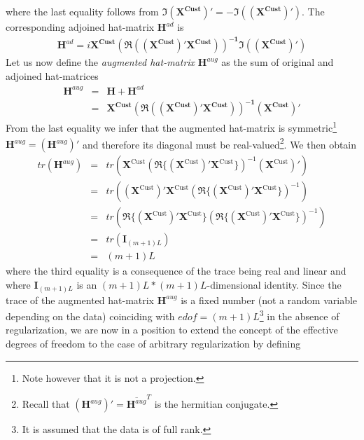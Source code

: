 \documentclass[a4paper]{book}
\begin{document}
where the last equality follows from $\mathbf{\Im\left(X^{\textrm{Cust}}\right)'}=-\mathbf{\Im\left((X^{\textrm{Cust}})'\right)}$. 
The corresponding adjoined hat-matrix $\mathbf{H}^{ad}$ is
\begin{eqnarray*}
\mathbf{H}^{ad}=i\mathbf{X^{\textrm{Cust}}}\mathbf{\left(\Re((X^{\textrm{Cust}})'X^{\textrm{Cust}})\right)^{-1}}\mathbf{\Im\left((X^{\textrm{Cust}})'\right)}
\end{eqnarray*}
Let us now define the \emph{augmented hat-matrix} $\mathbf{H}^{aug}$ as the sum of original and adjoined hat-matrices
\begin{eqnarray*}
\mathbf{H}^{aug}&=&\mathbf{H}+\mathbf{H}^{ad}\\
&=&\mathbf{X^{\textrm{Cust}}}\mathbf{\left(\Re((X^{\textrm{Cust}})'X^{\textrm{Cust}})\right)^{-1}}\mathbf{\left(X^{\textrm{Cust}}\right)'}
\end{eqnarray*}
From the last equality we infer that the augmented hat-matrix is symmetric\footnote{Note however that it is not a projection.} $\mathbf{H}^{aug}=(\mathbf{H}^{aug})'$ and therefore its diagonal must be real-valued\footnote{Recall that $(\mathbf{H}^{aug})'=\overline{\mathbf{H}^{aug}}^T$ is the hermitian conjugate.}. We then obtain 
\begin{eqnarray*}
tr(\mathbf{H}^{aug})&=&tr\left(\mathbf{X}^{\textrm{Cust}}\left(\Re\big\{(\mathbf{X}^{\textrm{Cust}})' \mathbf{X}^{\textrm{Cust}}\big\}
\right)^{-1}(\mathbf{X}^{\textrm{Cust}})'\right)\\
&=&tr\left((\mathbf{X}^{\textrm{Cust}})'\mathbf{X}^{\textrm{Cust}}\left(\Re\big\{(\mathbf{X}^{\textrm{Cust}})' \mathbf{X}^{\textrm{Cust}}\big\}\right)^{-1}\right)\\
&=&tr\left(\Re\Big\{(\mathbf{X}^{\textrm{Cust}})'\mathbf{X}^{\textrm{Cust}}\Big\}\left(\Re\big\{(\mathbf{X}^{\textrm{Cust}})' \mathbf{X}^{\textrm{Cust}}\big\}\right)^{-1}\right)\\
&=&tr(\mathbf{I}_{(m+1)L})\\
&=&(m+1)L
\end{eqnarray*}
where the third equality is a consequence of the trace being real and linear and where $\mathbf{I}_{(m+1)L}$ is an $(m+1)L*(m+1)L$-dimensional identity. Since the trace of the augmented hat-matrix $\mathbf{H}^{aug}$ is a fixed number (not a random variable depending on the data) coinciding with $edof=(m+1)L$\footnote{It is assumed that the data is of full rank.} in the absence of regularization, we are now in a position to extend the concept of the effective degrees of freedom to the case of arbitrary regularization by defining
\end{document}

